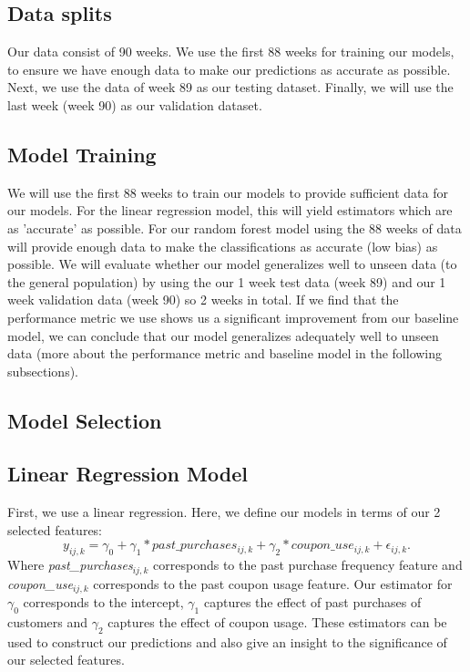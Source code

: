 \subsection{Data splits}
Our data consist of 90 weeks. We use the first 88 weeks for training our models,
to ensure we have enough data to make our predictions as accurate as possible.
Next, we use the data of week 89 as our testing dataset. Finally, we will use the
last week (week 90) as our validation dataset.

\subsection{Model Training}
We will use the first 88 weeks to train our models to provide sufficient data
for our models. For the linear regression model, this will yield estimators
which are as 'accurate' as possible. For our random forest model using the 88
weeks of data will provide enough data to make the classifications as accurate
(low bias) as possible. We will evaluate whether our model generalizes well to
unseen data (to the general population) by using the our 1 week test data (week
89) and our 1 week validation data (week 90) so 2 weeks in total. If we find
that the performance metric we use shows us a significant improvement from our
baseline model, we can conclude that our model generalizes adequately well to
unseen data (more about the performance metric and baseline model in the
following subsections).

\subsection{Model Selection}

\subsection{Linear Regression Model}
First, we use a linear regression. Here, we define our models in terms of our 2
selected features:
\begin{equation}
    y_{ij,k} = \gamma_{0} + \gamma_{1}*past\_purchases_{ij,k} +
    \gamma_{2}*coupon\_use_{ij,k} + \epsilon_{ij,k}.
\end{equation}
Where \textit{past\_purchases}$_{ij,k}$ corresponds to the past purchase
frequency feature and 
\textit{coupon\_use}$_{ij,k}$ corresponds to the past coupon usage feature. 
Our estimator for $\gamma_{0}$ corresponds to the intercept, 
$\gamma_{1}$ captures the effect of past purchases of customers and 
$\gamma_{2}$ captures the effect of coupon usage. These estimators can be used
to construct our predictions and also give an insight to the significance of our
selected features.

